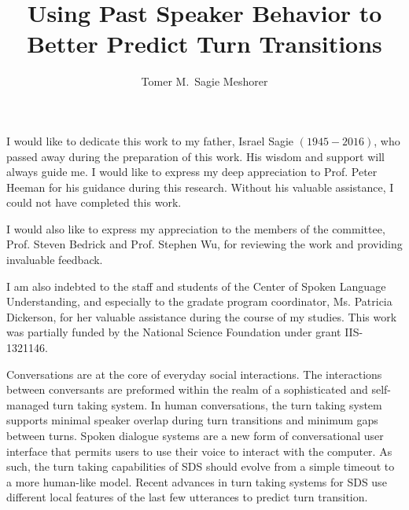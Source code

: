 \documentclass[copyright,masters]{cslu-thesis}
\begin{document}
\title{Using Past Speaker Behavior to Better Predict Turn Transitions}
\author{Tomer M.\ Sagie Meshorer}


\frontmatter


I would like to dedicate this work to my father, Israel Sagie $(1945-2016)$, who passed away during the preparation of this work.
His wisdom and support will always guide me.
I would like to express my deep appreciation to Prof. Peter Heeman for his guidance during this research. Without his valuable assistance,
I could not have completed this work.

I would also like to express my appreciation to the members of the committee, Prof. Steven Bedrick and Prof. Stephen Wu, for reviewing
the work and providing invaluable feedback.

I am also indebted to the staff and students of the Center of Spoken Language Understanding, and especially to the gradate program coordinator, Ms. Patricia Dickerson,
for her valuable assistance during the course of my studies.
This work was partially funded by the National Science Foundation under grant IIS-1321146.


\tableofcontents


\abstract
 Conversations are at the core of everyday social interactions. The interactions between conversants are preformed within the realm of a sophisticated and self-managed turn taking system. In human conversations, the turn taking system  supports minimal speaker overlap during turn transitions and minimum gaps between turns. Spoken dialogue systems are a new form of conversational user interface that permits users to use their voice to interact with the computer. As such, the turn taking capabilities of SDS should evolve from a simple timeout to a more human-like model. Recent advances in turn taking systems for SDS use different local features of the last few utterances to predict turn transition.
\end{document}
